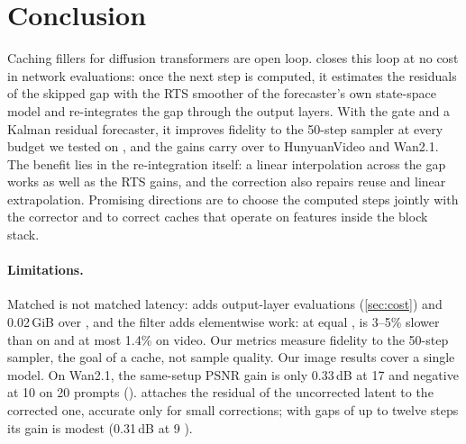 \section{Conclusion}
\label{sec:conclusion}

Caching fillers for diffusion transformers are open loop. \pcgs closes this loop at no cost in network evaluations: once
the next step is computed, it estimates the residuals of the skipped gap with the RTS smoother of the forecaster's own
state-space model and re-integrates the gap through the output layers. With the \sea gate and a Kalman residual
forecaster, it improves fidelity to the 50-step sampler at every budget we tested on \flux, and the gains carry over to
HunyuanVideo and Wan2.1. The
benefit lies in the re-integration itself: a linear interpolation across the gap works as well as the RTS gains, and
the correction also repairs reuse and linear extrapolation. Promising directions are to choose the computed steps jointly
with the corrector and to correct caches that operate on features inside the block stack.

\paragraph{Limitations.}
Matched \nfe is not matched latency: \pcgs adds output-layer evaluations (\cref{sec:cost}) and 0.02\,GiB over
\kalsea, and the filter adds elementwise work: at equal \nfe, \ours is 3--5\% slower than
\seacache on \flux and at most 1.4\% on video.
Our metrics measure fidelity to the 50-step sampler, the goal of a cache, not sample quality. Our image results cover a single model.
On Wan2.1, the same-setup PSNR gain is only 0.33\,dB at 17 \nfe and negative at 10 \nfe on 20 prompts (). \pcgs attaches the
residual of the uncorrected latent to the corrected one, accurate only for small corrections; with gaps of up to
twelve steps its gain is modest (0.31\,dB at 9 \nfe).
